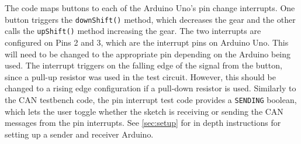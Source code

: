 \documentclass[letterpaper]{article}
\begin{document}
The code maps buttons to each of the Arduino Uno's pin change interrupts. One
button triggers the \lstinline{downShift()} method, which decreases the gear and
the other calls the \lstinline{upShift()} method increasing the gear. The two
interrupts are configured on Pins 2 and 3, which are the interrupt pins on
Arduino Uno. This will need to be changed to the appropriate pin depending on the
Arduino being used. The interrupt triggers on the falling edge of the signal
from the button, since a pull-up resistor was used in the test circuit. However,
this should be changed to a rising edge configuration if a pull-down resistor is
used. Similarly to the CAN testbench code, the pin interrupt test code provides
a \lstinline{SENDING} boolean, which lets the user toggle whether the sketch is
receiving or sending the CAN messages from the pin interrupts. See 
\autoref{sec:setup} for in depth instructions for setting up a
sender and receiver Arduino.
\end{document}
